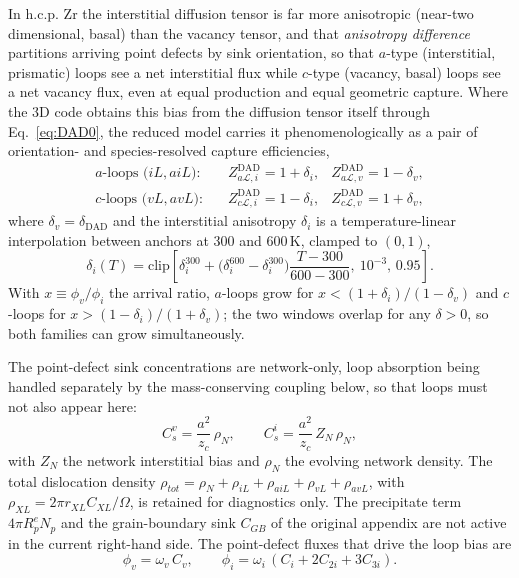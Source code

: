\documentclass{article}
\begin{document}
In h.c.p. Zr the interstitial diffusion tensor is far more anisotropic (near-two
dimensional, basal) than the vacancy tensor, and that \emph{anisotropy difference}
partitions arriving point defects by sink orientation, so that $a$-type
(interstitial, prismatic) loops see a net interstitial flux while $c$-type
(vacancy, basal) loops see a net vacancy flux, even at equal production and equal
geometric capture. Where the $3$D code obtains this bias from the diffusion tensor
itself through Eq.~\eqref{eq:DAD0}, the reduced model carries it phenomenologically
as a pair of orientation- and species-resolved capture efficiencies,
\begin{align}
\text{$a$-loops ($iL,aiL$):}\quad & Z^{\mathrm{DAD}}_{a\mathcal L,i}=1+\delta_i, & Z^{\mathrm{DAD}}_{a\mathcal L,v}=1-\delta_v,\\
\text{$c$-loops ($vL,avL$):}\quad & Z^{\mathrm{DAD}}_{c\mathcal L,i}=1-\delta_i, & Z^{\mathrm{DAD}}_{c\mathcal L,v}=1+\delta_v,
\label{eq:DAD}
\end{align}
where $\delta_v=\delta_{\mathrm{DAD}}$ and the interstitial anisotropy $\delta_i$
is a temperature-linear interpolation between anchors at $300$ and $600\,$K,
clamped to $(0,1)$,
\begin{equation}
\delta_i(T)=\mathrm{clip}\!\left[\delta_i^{300}
  +\bigl(\delta_i^{600}-\delta_i^{300}\bigr)\frac{T-300}{600-300},\ 10^{-3},\,0.95\right].
\end{equation}
With $x\equiv\phi_v/\phi_i$ the arrival ratio, $a$-loops grow for
$x<(1+\delta_i)/(1-\delta_v)$ and $c$-loops for $x>(1-\delta_i)/(1+\delta_v)$; the
two windows overlap for any $\delta>0$, so both families can grow simultaneously.

The point-defect sink concentrations are network-only, loop absorption being
handled separately by the mass-conserving coupling below, so that loops must not
also appear here:
\begin{equation}
C_s^v=\frac{a^2}{z_c}\,\rho_N,\qquad
C_s^i=\frac{a^2}{z_c}\,Z_N\,\rho_N,
\label{eq:sinks}
\end{equation}
with $Z_N$ the network interstitial bias and $\rho_N$ the evolving network
density. The total dislocation density
$\rho_{tot}=\rho_N+\rho_{iL}+\rho_{aiL}+\rho_{vL}+\rho_{avL}$, with
$\rho_{XL}=2\pi r_{XL}C_{XL}/\Omega$, is retained for diagnostics only. The
precipitate term $4\pi R_p^e N_p$ and the grain-boundary sink $C_{GB}$ of the
original appendix are not active in the current right-hand side. The point-defect
fluxes that drive the loop bias are
\begin{equation}
\phi_v=\omega_v\,C_v,\qquad
\phi_i=\omega_i\,(C_i+2C_{2i}+3C_{3i}).
\label{eq:flux}
\end{equation}
\end{document}
